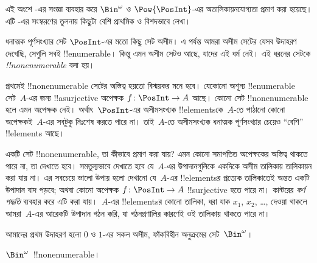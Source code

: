 \documentclass[../../../include/open-logic-section]{subfiles}
\begin{document}


\begin{editorial}
  এই অংশে -এর সংজ্ঞা ব্যবহার করে $\Bin^\omega$ ও $\Pow{\PosInt}$-এর অতালিকায়নযোগ্যতা প্রমাণ করা হয়েছে। এটি -এর সংস্করণের তুলনায় কিছুটা বেশি প্রাথমিক ও বিশদভাবে লেখা।
\end{editorial}

ধনাত্মক পূর্ণসংখ্যার সেট $\PosInt$-এর মতো কিছু সেট অসীম। এ পর্যন্ত আমরা অসীম সেটের যেসব উদাহরণ দেখেছি, সেগুলি সবই !!{enumerable}। কিন্তু এমন অসীম সেটও আছে, যাদের এই ধর্ম নেই। এই ধরনের সেটকে \emph{!!{nonenumerable}} বলা হয়।

প্রথমেই !!{nonenumerable} সেটের অস্তিত্ব হয়তো বিস্ময়কর মনে হবে। যেকোনো অশূন্য !!{enumerable} সেট~$A$-এর জন্য !!a{surjective} অপেক্ষক $f \colon \PosInt \to A$ আছে। কোনো সেট !!{nonenumerable} হলে এমন অপেক্ষক নেই। অর্থাৎ~$\PosInt$-এর অসীমসংখ্যক !!{element}sকে~$A$-তে পাঠানো কোনো অপেক্ষকই~$A$-এর সবটুকু নিঃশেষ করতে পারে না। তাই~$A$-তে অসীমসংখ্যক ধনাত্মক পূর্ণসংখ্যার চেয়েও ``বেশি'' !!{element}s আছে।

একটি সেট !!{nonenumerable}, তা কীভাবে প্রমাণ করা যায়? এমন কোনো সমাপতিত অপেক্ষকের অস্তিত্ব থাকতে পারে না, তা দেখাতে হবে। সমতুল্যভাবে দেখাতে হবে যে~$A$-এর উপাদানগুলিকে একদিকে অসীম তালিকায় তালিকায়ন করা যায় না। এর সবচেয়ে ভালো উপায় হলো দেখানো যে~$A$-এর !!{element}sর প্রত্যেক তালিকাতেই অন্তত একটি উপাদান বাদ পড়বে; অথবা কোনো অপেক্ষক $f\colon \PosInt \to A$ !!{surjective} হতে পারে না। কান্টরের \emph{কর্ণ পদ্ধতি} ব্যবহার করে এটি করা যায়।~$A$-এর !!{element}sর কোনো তালিকা, ধরা যাক $x_1$, $x_2$, \dots, দেওয়া থাকলে আমরা~$A$-এর আরেকটি উপাদান গঠন করি, যা গঠনপ্রণালির কারণেই ওই তালিকায় থাকতে পারে না।

আমাদের প্রথম উদাহরণ হলো $0$ ও $1$-এর সকল অসীম, ফাঁকবিহীন অনুক্রমের সেট~$\Bin^\omega$।

\begin{thm}
$\Bin^\omega$~!!{nonenumerable}।
\end{thm}
\end{document}
